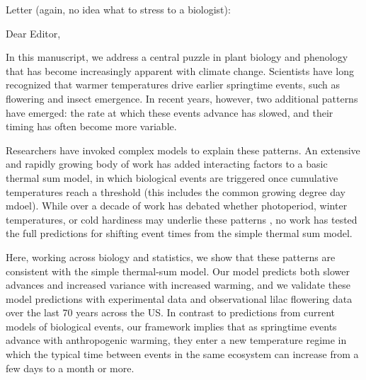 Letter (again, no idea what to stress to a biologist):

Dear Editor,

In this manuscript, we address a central puzzle in plant biology and phenology that has become increasingly apparent with climate change. Scientists have long recognized that warmer temperatures drive earlier springtime events, such as flowering and insect emergence. In recent years, however, two additional patterns have emerged: the rate at which these events advance has slowed, and their timing has often become more variable. %

Researchers have invoked complex models to explain these patterns. An extensive and rapidly growing body of work has added interacting factors to a basic thermal sum model, in which biological events are triggered once cumulative temperatures reach a threshold (this includes the common growing degree day mdoel). While over a decade of work has debated whether photoperiod, winter temperatures, or cold hardiness may underlie these patterns \citep{fu2015declining,kovaleskipreprint}, no work has tested the full predictions for shifting event times from the simple thermal sum model. 

Here, working across biology and statistics, we show that these patterns are consistent with the simple thermal-sum model. Our model predicts both slower advances and increased variance with increased warming, and we validate these model predictions with experimental data and observational lilac flowering data over the last 70 years across the US. In contrast to predictions from current models of biological events, our framework implies that as springtime events advance with anthropogenic warming, they enter a new temperature regime in which the typical time between events in the same ecosystem can increase from a few days to a month or more. %

